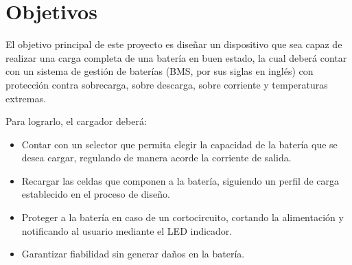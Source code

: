\section{Objetivos}

El objetivo principal de este proyecto es diseñar un dispositivo que sea capaz de realizar
una carga completa de una batería en buen estado,
la cual deberá contar con un sistema de gestión de baterías (BMS, por sus siglas en inglés)
con protección contra sobrecarga, sobre descarga, sobre corriente y temperaturas extremas.

Para lograrlo, el cargador deberá:
\begin{itemize}
    \item Contar con un selector que permita elegir la capacidad de la batería que se desea cargar, regulando de manera acorde la corriente de salida.
    \item Recargar las celdas que componen a la batería, siguiendo un perfil de carga establecido en el proceso de diseño.
    \item Proteger a la batería en caso de un cortocircuito, cortando la alimentación y notificando al usuario mediante el LED indicador.
    \item Garantizar fiabilidad sin generar daños en la batería.
\end{itemize}